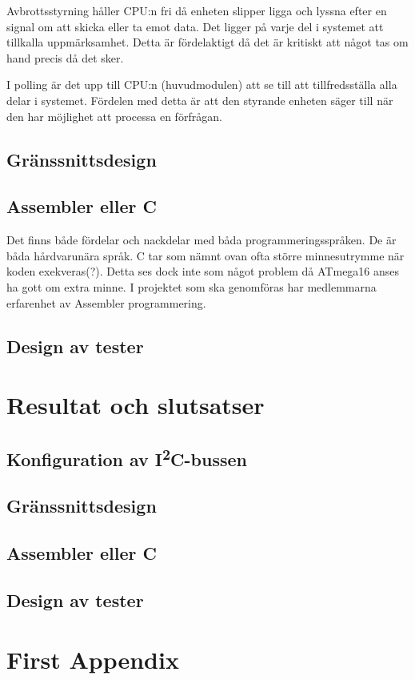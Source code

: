 \documentclass[11pt]{article}
\begin{document}
\begin{flushleft}

Avbrottsstyrning håller CPU:n fri då enheten slipper ligga och lyssna efter en signal om att skicka eller ta emot data. Det ligger på varje del i systemet att tillkalla uppmärksamhet. Detta är fördelaktigt då det är kritiskt att något tas om hand precis då det sker.

I polling är det upp till CPU:n (huvudmodulen) att se till att tillfredsställa alla delar i systemet. Fördelen med detta är att den styrande enheten säger till när den har möjlighet att processa en förfrågan.

\subsection{Gränssnittsdesign}

\subsection{Assembler eller C}

Det finns både fördelar och nackdelar med båda programmeringsspråken. De är båda hårdvarunära språk. C tar som nämnt ovan ofta större minnesutrymme när koden exekveras(?). Detta ses dock inte som något problem då ATmega16 anses ha gott om extra minne.
I projektet som ska genomföras har medlemmarna erfarenhet av Assembler programmering.

\subsection{Design av tester}
 
\pagebreak

\section{Resultat och slutsatser}

\subsection{Konfiguration av I\textsuperscript{2}C-bussen}

\subsection{Gränssnittsdesign}

\subsection{Assembler eller C}

\subsection{Design av tester}

\pagebreak
{}



\pagebreak
\appendix
\section{First Appendix}

\end{flushleft}
\end{document}
